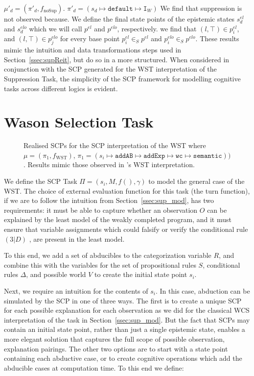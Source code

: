 $\mu'_d=(\pi'_d, f_\text{noSup})$.
$\pi'_d=(s_d \longmapsto \texttt{default} \longmapsto \texttt{I}_W)$
We find that suppression is not observed because. We define the final state points of the epistemic states $s_d^{el}$ and $s_d^{elo}$ which we will call $p^{el}$ and $p^{elo}$, respectively. we find that $(l, \top) \in p^{el}_i$, and $(l, \top) \in p^{elo}_j$ for every base point $p^{el}_i \in_S p^{el}$ and $p^{elo}_i \in_S p^{elo}$. These results mimic the intuition and data transformations steps used in Section~\ref{ssec:supReit}, but do so in a more structured. When considered in conjunction with the SCP generated for the WST interpretation of the Suppression Task, the simplicity of the SCP framework for modelling cognitive tasks across different logics is evident.

\section{Wason Selection Task}\label{sec:wstSCP}

\begin{figure}

\caption{Realised SCPs for the SCP interpretation of the WST where $\mu=(\pi_1,f_\text{WST})$, $\pi_1=(s_i \longmapsto \texttt{addAB} \longmapsto \texttt{addExp}  \longmapsto \texttt{wc} \longmapsto \texttt{semantic}))$. Results mimic those observed in \citep{holldobler2015weak}'s WST interpretation.}
\label{fig:rSCP_WST}
\end{figure}

We define the SCP Task $\Pi=(s_i,M,f(),\gamma)$ to model the general case of the WST. The choice of external evaluation function for this task (the turn function), if we are to follow the intuition from Section~\ref{ssec:sup_mod}, has two requirements: it must be able to capture whether an observation $O$ can be explained by the least model of the weakly completed program, and it must ensure that variable assignments which could falsify or verify the conditional rule $(3|D)$ , are present in the least model. 

To this end, we add a set of abducibles to the categorization variable $R$, and combine this with the variables for the set of propositional rules $S$, conditional rules $\Delta$, and possible world $V$ to create the initial state point $s_i$.

Next, we require an intuition for the contents of $s_i$. In this case, abduction can be simulated by the SCP in one of three ways. The first is to create a unique SCP for each possible explanation for each observation as we did for the classical WCS interpretation of the task in Section~\ref{ssec:sup_mod}. But the fact that SCPs may contain an initial state point, rather than just a single epistemic state, enables a more elegant solution that captures the full scope of possible observation, explanation pairings. The other two options are to start with a state point containing each abductive case, or to create cognitive operations which add the abducible cases at computation time. To this end we define:

